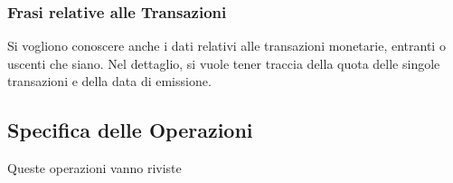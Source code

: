 		\subsubsection{Frasi relative alle Transazioni}
		
			Si vogliono conoscere anche i dati relativi alle transazioni monetarie, entranti o uscenti che siano. Nel dettaglio, si vuole tener traccia della quota delle singole transazioni e della data di emissione.
			
	\subsection{Specifica delle Operazioni}
		
		Queste operazioni vanno riviste
	
		\begin{enumerate}
			

\end{enumerate}
